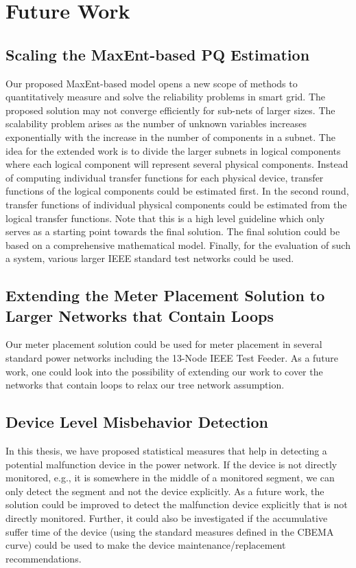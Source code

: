 \section{Future Work}
\subsection{Scaling the MaxEnt-based PQ Estimation}
Our proposed MaxEnt-based model opens a new scope of methods to quantitatively measure and solve the reliability problems in smart grid. The proposed solution may not converge efficiently for sub-nets of larger sizes. The scalability problem arises as the number of unknown variables increases exponentially with the increase in the number of components in a subnet. The idea for the extended work is to divide the larger subnets in logical components where each logical component will represent several physical components. Instead of computing individual transfer functions for each physical device, transfer functions of the logical components could be estimated first. In the second round, transfer functions of individual physical components could be estimated from the logical transfer functions. Note that this is a high level guideline which only serves as a starting point towards the final solution. The final solution could be based on a comprehensive mathematical model. Finally, for the evaluation of such a system, various larger IEEE standard test networks could be used.


\subsection{Extending the Meter Placement Solution to Larger Networks that Contain Loops}
Our meter placement solution could be used for meter placement in several standard power networks including the 13-Node IEEE Test Feeder. As a future work, one could look into the possibility of extending our work to cover the networks that contain loops to relax our tree network assumption.

\subsection{Device Level Misbehavior Detection}
In this thesis, we have proposed statistical measures that help in detecting a potential malfunction device in the power network. If the device is not directly monitored, e.g., it is somewhere in the middle of a monitored segment, we can only detect the segment and not the device explicitly. As a future work, the solution could be improved to detect the malfunction device explicitly that is not directly monitored. Further, it could also be investigated if the accumulative suffer time of the device (using the standard measures defined in the CBEMA curve) could be used to make the device maintenance/replacement recommendations.
